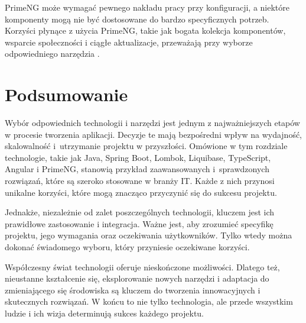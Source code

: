 PrimeNG może wymagać pewnego nakładu pracy przy konfiguracji, a niektóre komponenty mogą nie być dostosowane do bardzo specyficznych potrzeb. Korzyści płynące z użycia PrimeNG, takie jak bogata kolekcja komponentów, wsparcie społeczności i ciągłe aktualizacje, przeważają przy wyborze odpowiedniego narzędzia \cite{primengSpecs}.

\section{Podsumowanie}

Wybór odpowiednich technologii i narzędzi jest jednym z najważniejszych etapów w procesie tworzenia aplikacji. Decyzje te mają bezpośredni wpływ na wydajność, skalowalność i~utrzymanie projektu w przyszłości. Omówione w tym rozdziale technologie, takie jak Java, Spring Boot, Lombok, Liquibase, TypeScript, Angular i PrimeNG, stanowią przykład zaawansowanych i~sprawdzonych rozwiązań, które są szeroko stosowane w branży IT. Każde z nich przynosi unikalne korzyści, które mogą znacząco przyczynić się do sukcesu projektu.

Jednakże, niezależnie od zalet poszczególnych technologii, kluczem jest ich prawidłowe zastosowanie i integracja. Ważne jest, aby zrozumieć specyfikę projektu, jego wymagania oraz oczekiwania użytkowników. Tylko wtedy można dokonać świadomego wyboru, który przyniesie oczekiwane korzyści.

Współczesny świat technologii oferuje nieskończone możliwości. Dlatego też, nieustanne kształcenie się, eksplorowanie nowych narzędzi i adaptacja do zmieniającego się środowiska są kluczem do tworzenia innowacyjnych i skutecznych rozwiązań. W końcu to nie tylko technologia, ale przede wszystkim ludzie i ich wizja determinują sukces każdego projektu.